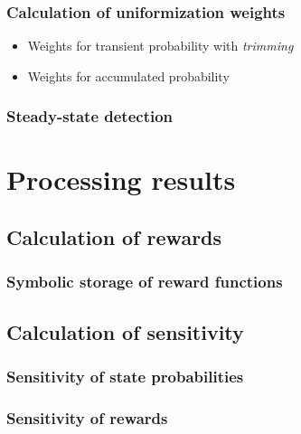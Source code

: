 \subsubsection{Calculation of uniformization weights}

\begin{itemize}
\item Weights for transient probability with \emph{trimming}
\item Weights for accumulated probability
\end{itemize}

\subsubsection{Steady-state detection}

\section{Processing results}

\subsection{Calculation of rewards}

\subsubsection{Symbolic storage of reward functions}

\subsection{Calculation of sensitivity}

\subsubsection{Sensitivity of state probabilities}

\subsubsection{Sensitivity of rewards}